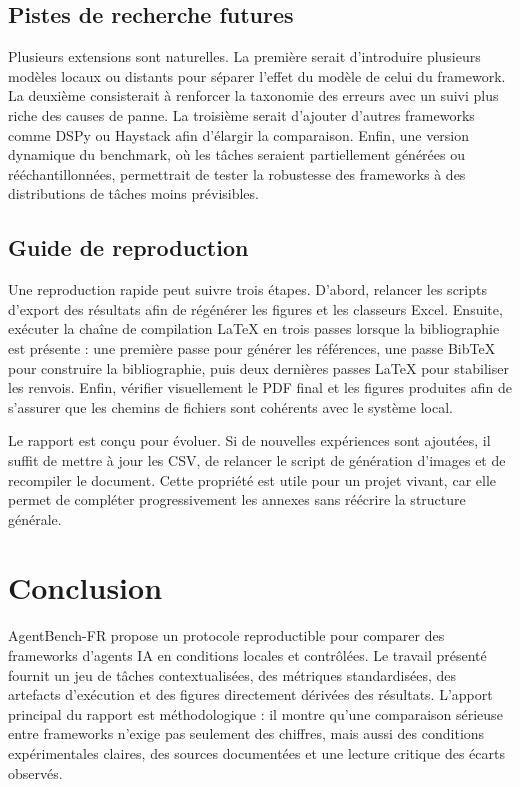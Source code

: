 \documentclass[11pt,a4paper]{article}
\begin{document}
\subsection{Pistes de recherche futures}
Plusieurs extensions sont naturelles. La première serait d'introduire plusieurs modèles locaux ou distants pour séparer l'effet du modèle de celui du framework. La deuxième consisterait à renforcer la taxonomie des erreurs avec un suivi plus riche des causes de panne. La troisième serait d'ajouter d'autres frameworks comme DSPy ou Haystack afin d'élargir la comparaison. Enfin, une version dynamique du benchmark, où les tâches seraient partiellement générées ou rééchantillonnées, permettrait de tester la robustesse des frameworks à des distributions de tâches moins prévisibles.

\subsection{Guide de reproduction}
Une reproduction rapide peut suivre trois étapes. D'abord, relancer les scripts d'export des résultats afin de régénérer les figures et les classeurs Excel. Ensuite, exécuter la chaîne de compilation LaTeX en trois passes lorsque la bibliographie est présente : une première passe pour générer les références, une passe BibTeX pour construire la bibliographie, puis deux dernières passes LaTeX pour stabiliser les renvois. Enfin, vérifier visuellement le PDF final et les figures produites afin de s'assurer que les chemins de fichiers sont cohérents avec le système local.

Le rapport est conçu pour évoluer. Si de nouvelles expériences sont ajoutées, il suffit de mettre à jour les CSV, de relancer le script de génération d'images et de recompiler le document. Cette propriété est utile pour un projet vivant, car elle permet de compléter progressivement les annexes sans réécrire la structure générale.

\section*{Conclusion}
AgentBench-FR propose un protocole reproductible pour comparer des frameworks d'agents IA en conditions locales et contrôlées. Le travail présenté fournit un jeu de tâches contextualisées, des métriques standardisées, des artefacts d'exécution et des figures directement dérivées des résultats. L'apport principal du rapport est méthodologique : il montre qu'une comparaison sérieuse entre frameworks n'exige pas seulement des chiffres, mais aussi des conditions expérimentales claires, des sources documentées et une lecture critique des écarts observés.
\end{document}
